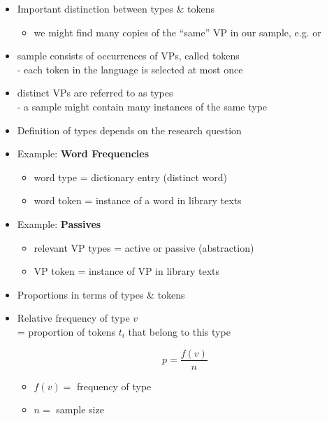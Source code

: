 \documentclass[a4paper,landscape,headrule,footrule,dvips]{foils}
\begin{document}
\begin{CJK}{UTF8}{min}
\begin{itemize}
\item Important distinction between types \& tokens
\begin{itemize}
\item we might find many copies of the “same” VP in our
sample, e.g.  or
\end{itemize}
\item sample consists of occurrences of VPs, called tokens
\\ - each token in the language is selected at most once
\item distinct VPs are referred to as types
\\ - a sample might contain many instances of the same type
\item Definition of types depends  on the research question
\end{itemize}

\begin{itemize}
\item Example: \textbf{Word Frequencies}
\begin{itemize}
\item word type = dictionary entry (distinct word)
\item word token = instance of a word in library texts
\end{itemize}
\item Example: \textbf{Passives}
\begin{itemize}
\item relevant VP types = active or passive (\into abstraction)
\item VP token = instance of VP in library texts
\end{itemize}
\end{itemize}

\begin{itemize}
\item Proportions in terms of types \& tokens
\item Relative frequency of type $v$
\\ = proportion of tokens $t_i$ that belong to this type

\begin{equation}
  \label{eq:2}
   p = \frac{f(v)}{n}
\end{equation}
\begin{itemize}
\item $f(v) = $ frequency of type
\item $n = $ sample size
\end{itemize}
\end{itemize}




\end{CJK}
\end{document}
